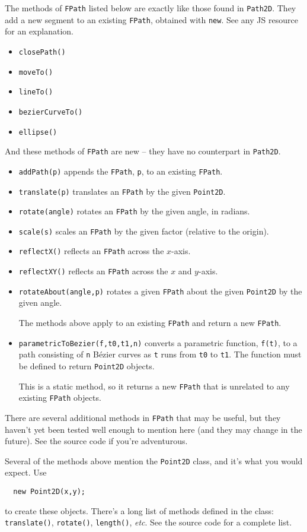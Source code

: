 \documentclass[10pt]{article}
\begin{document}
The methods of {\tt FPath} listed below are exactly like those found
in {\tt Path2D}. They add a new segment to an existing {\tt FPath},
obtained with {\tt new}. See any JS resource for an explanation. 
\begin{itemize}[itemsep=-1pt,leftmargin=*]
\item {\tt closePath()}
\item {\tt moveTo()}
\item {\tt lineTo()}
\item {\tt bezierCurveTo()}
\item {\tt ellipse()}
\end{itemize}
And these methods of {\tt FPath} are new -- they have no counterpart
in {\tt Path2D}.
\begin{itemize}[itemsep=-1pt,leftmargin=*]
\item {\tt addPath(p)} appends the {\tt FPath}, {\tt p}, to an
  existing {\tt FPath}. 
\item {\tt translate(p)} translates an {\tt FPath} by the given {\tt Point2D}.
\item {\tt rotate(angle)} rotates an {\tt FPath} by the given angle,
  in radians.
\item {\tt scale(s)} scales an {\tt FPath} by the given factor
  (relative to the origin).
\item {\tt reflectX()} reflects an {\tt FPath} across the $x$-axis.
\item {\tt reflectXY()} reflects an {\tt FPath} across the $x$ and $y$-axis.
\item {\tt rotateAbout(angle,p)} rotates a given {\tt FPath} about the
  given {\tt Point2D} by the given angle.

The methods above apply to an existing {\tt FPath} and return a new {\tt FPath}.
\item {\tt parametricToBezier(f,t0,t1,n)} converts a parametric
  function, {\tt f(t)}, to a path consisting of {\tt n} B\'ezier
  curves as   {\tt t} runs from {\tt t0} to {\tt t1}. The function
  must be defined to return {\tt Point2D} objects.

This is a static method, so it returns a new {\tt FPath} that is unrelated to any existing {\tt FPath} objects.
\end{itemize}
There are several additional methods in {\tt FPath} that may be
useful, but they haven't yet been tested well enough to mention
here (and they may change in the future). See the source code if
you're adventurous. 

Several of the methods above mention the {\tt Point2D} class, and it's what you would expect. Use
\begin{verbatim}
  new Point2D(x,y);
\end{verbatim}
to create these objects. There's a long list of methods defined in the
class: {\tt translate()}, {\tt rotate()}, {\tt length()},
\emph{etc}. See the source code for a complete list. 
\end{document}
